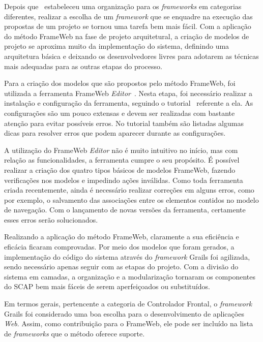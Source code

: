 Depois que~ estabeleceu uma organização para os \textit{frameworks} em categorias diferentes, realizar a escolha de um \textit{framework} que se enquadre na execução das propostas de um projeto se tornou uma tarefa bem mais fácil. Com a aplicação do método FrameWeb na fase de projeto arquitetural, a criação de modelos de projeto se aproxima muito da implementação do sistema, definindo uma arquitetura básica e deixando os desenvolvedores livres para adotarem as técnicas mais adequadas para as outras etapas do processo.

Para a criação dos modelos que são propostos pelo método FrameWeb, foi utilizada a ferramenta FrameWeb \textit{Editor}~\cite{campos-souza:webmedia17}. Nesta etapa, foi necessário realizar a instalação e configuração da ferramenta, seguindo o tutorial~\cite{souza:ftt21} referente a ela. As configurações são um pouco extensas e devem ser realizadas com bastante atenção para evitar possíveis erros. No tutorial também são listadas algumas dicas para resolver erros que podem aparecer durante as configurações.

A utilização do FrameWeb \textit{Editor} não é muito intuitivo no início, mas com relação as funcionalidades, a ferramenta cumpre o seu propósito. É possível realizar a criação dos quatro tipos básicos de modelos FrameWeb, fazendo verificações nos modelos e impedindo ações inválidas. Como toda ferramenta criada recentemente, ainda é necessário realizar correções em alguns erros, como por exemplo, o salvamento das associações entre os elementos contidos no modelo de navegação. Com o lançamento de novas versões da ferramenta, certamente esses erros serão solucionados.

Realizando a aplicação do método FrameWeb, claramente a sua eficiência e eficácia ficaram comprovadas. Por meio dos modelos que foram gerados, a implementação do código do sistema através do \textit{framework} Grails foi agilizada, sendo necessário apenas seguir com as etapas do projeto. Com a divisão do sistema em camadas, a organização e a modularização tornaram os componentes do SCAP bem mais fáceis de serem aperfeiçoados ou substituídos.

Em termos gerais, pertencente a categoria de Controlador Frontal, o \textit{framework} Grails foi considerado uma boa escolha para o desenvolvimento de aplicações \textit{Web}. Assim, como contribuição para o FrameWeb, ele pode ser incluído na lista de \textit{frameworks} que o método oferece suporte.                          


